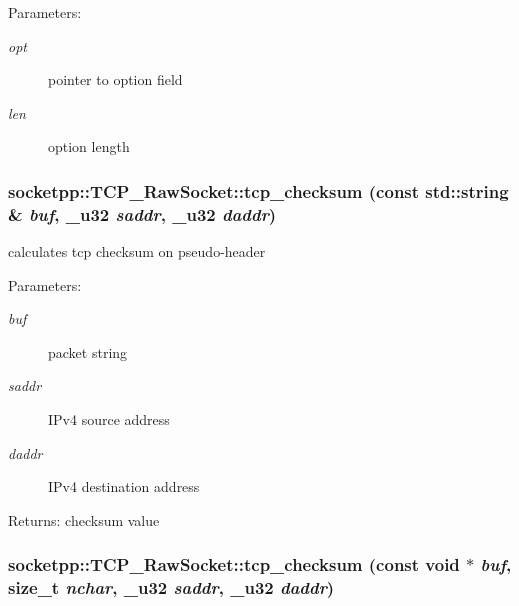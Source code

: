 \begin{Desc}
\item[Parameters:]
\begin{description}
\item[{\em opt}]pointer to option field \item[{\em len}]option length \end{description}
\end{Desc}
\hypertarget{classsocketpp_1_1TCP__RawSocket_59a27cc258c1007b2f7e68428fd50f80}{
\subsubsection[{tcp\_\-checksum}]{ socketpp::TCP\_\-RawSocket::tcp\_\-checksum (const std::string \& {\em buf}, \/  {\bf \_\-u32} {\em saddr}, \/  {\bf \_\-u32} {\em daddr})}}
\label{classsocketpp_1_1TCP__RawSocket_59a27cc258c1007b2f7e68428fd50f80}


calculates tcp checksum on pseudo-header 

\begin{Desc}
\item[Parameters:]
\begin{description}
\item[{\em buf}]packet string \item[{\em saddr}]IPv4 source address \item[{\em daddr}]IPv4 destination address \end{description}
\end{Desc}
\begin{Desc}
\item[Returns:]checksum value \end{Desc}
\hypertarget{classsocketpp_1_1TCP__RawSocket_d0b16fff831e7e756a127cc47de4b9aa}{
\subsubsection[{tcp\_\-checksum}]{ socketpp::TCP\_\-RawSocket::tcp\_\-checksum (const void $\ast$ {\em buf}, \/  size\_\-t {\em nchar}, \/  {\bf \_\-u32} {\em saddr}, \/  {\bf \_\-u32} {\em daddr})}}
\label{classsocketpp_1_1TCP__RawSocket_d0b16fff831e7e756a127cc47de4b9aa}


